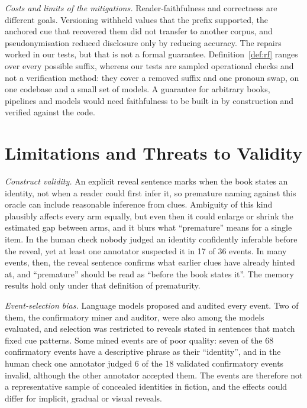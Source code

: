 \documentclass[sn-mathphys]{sn-jnl}%
\theoremstyle{thmstyleone}%
\theoremstyle{thmstyletwo}%
\theoremstyle{thmstylethree}%
\begin{document}
\emph{Costs and limits of the mitigations.} Reader-faithfulness and correctness are different goals. Versioning withheld values that the prefix supported, the anchored cue that recovered them did not transfer to another corpus, and pseudonymisation reduced disclosure only by reducing accuracy. The repairs worked in our tests, but that is not a formal guarantee. Definition~\ref{def:rf} ranges over every possible suffix, whereas our tests are sampled operational checks and not a verification method: they cover a removed suffix and one pronoun swap, on one codebase and a small set of models. A guarantee for arbitrary books, pipelines and models would need faithfulness to be built in by construction and verified against the code.

\section{Limitations and Threats to Validity}\label{sec:limits}

\emph{Construct validity.} An explicit reveal sentence marks when the book states an identity, not when a reader could first infer it, so premature naming against this oracle can include reasonable inference from clues. Ambiguity of this kind plausibly affects every arm equally, but even then it could enlarge or shrink the estimated gap between arms, and it blurs what ``premature'' means for a single item. In the human check nobody judged an identity confidently inferable before the reveal, yet at least one annotator suspected it in 17 of 36 events. In many events, then, the reveal sentence confirms what earlier clues have already hinted at, and ``premature'' should be read as ``before the book states it''. The memory results hold only under that definition of prematurity.

\emph{Event-selection bias.} Language models proposed and audited every event. Two of them, the confirmatory miner and auditor, were also among the models evaluated, and selection was restricted to reveals stated in sentences that match fixed cue patterns. Some mined events are of poor quality: seven of the 68 confirmatory events have a descriptive phrase as their ``identity'', and in the human check one annotator judged 6 of the 18 validated confirmatory events invalid, although the other annotator accepted them. The events are therefore not a representative sample of concealed identities in fiction, and the effects could differ for implicit, gradual or visual reveals.
\end{document}
